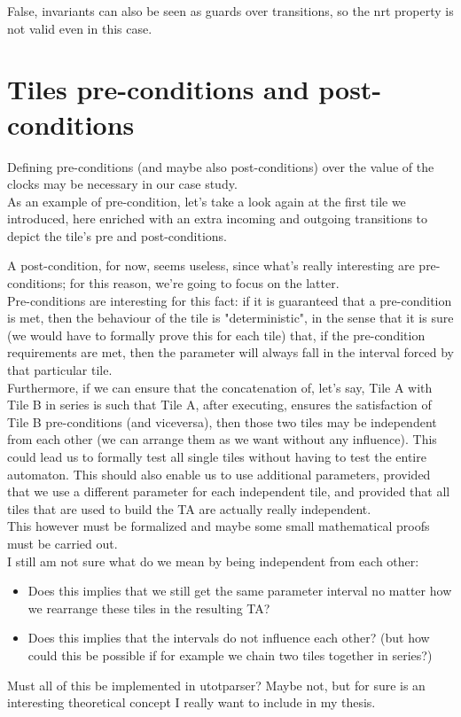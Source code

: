 \documentclass[12pt, a4paper]{article}
\begin{document}
\noindent
False, invariants can also be seen as guards over transitions, so the nrt property is not valid even in this case.

\newpage

\section{Tiles pre-conditions and post-conditions}

\noindent
Defining pre-conditions (and maybe also post-conditions) over the value of the clocks may be necessary in our case study.\\
As an example of pre-condition, let's take a look again at the first tile we introduced, here enriched with an extra incoming and outgoing transitions to depict the tile's pre and post-conditions.



\noindent
A post-condition, for now, seems useless, since what's really interesting are pre-conditions; for this reason, we're going to focus on the latter.\\
Pre-conditions are interesting for this fact: if it is guaranteed that a pre-condition is met, then the behaviour of the tile is "deterministic", in the sense that it is sure (we would have to formally prove this for each tile) that, if the pre-condition requirements are met, then the parameter will always fall in the interval forced by that particular tile.\\

\noindent
Furthermore, if we can ensure that the concatenation of, let's say, Tile A with Tile B in series is such that Tile A, after executing, ensures the satisfaction of Tile B pre-conditions (and viceversa), then those two tiles may be independent from each other (we can arrange them as we want without any influence). This could lead us to formally test all single tiles without having to test the entire automaton. This should also enable us to use additional parameters, provided that we use a different parameter for each independent tile, and provided that all tiles that are used to build the TA are actually really independent.\\
This however must be formalized and maybe some small mathematical proofs must be carried out.\\

\noindent
I still am not sure what do we mean by being independent from each other: 
\begin{itemize}
\item Does this implies that we still get the same parameter interval no matter how we rearrange these tiles in the resulting TA?
\item Does this implies that the intervals do not influence each other? (but how could this be possible if for example we chain two tiles together in series?)
\end{itemize}


\noindent
Must all of this be implemented in utotparser? Maybe not, but for sure is an interesting theoretical concept I really want to include in my thesis.
\end{document}
